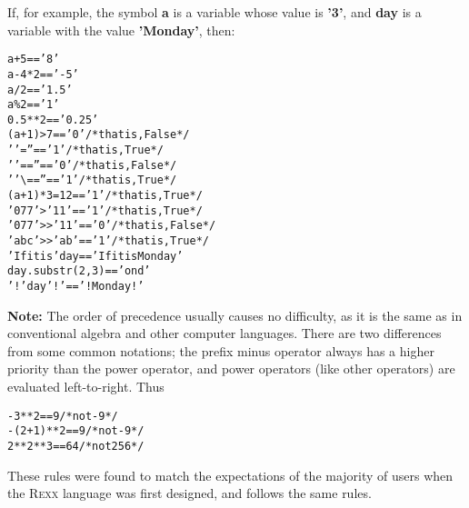  If, for example, the symbol \textbf{a} is a variable whose value
is \textbf{'3'}, and \textbf{day} is a variable with the
value \textbf{'Monday'}, then:
\begin{alltt}
a+5              ==  '8'
a-4*2            ==  '-5'
a/2              ==  '1.5'
a\%2              ==  '1'
0.5**2           ==  '0.25'
(a+1)>7          ==  '0'            /* that is, False */
' '=''           ==  '1'            /* that is, True  */
' '==''          ==  '0'            /* that is, False */
' '\textbackslash ==''         ==  '1'            /* that is, True  */
(a+1)*3=12       ==  '1'            /* that is, True  */
'077'>'11'       ==  '1'            /* that is, True  */
'077'>>'11'      ==  '0'            /* that is, False */
'abc'>>'ab'      ==  '1'            /* that is, True  */
'If it is' day   ==  'If it is Monday'
day.substr(2,3)  ==  'ond'
'!'day'!'        ==  '!Monday!'
\end{alltt}
\textbf{Note: }The \nr{} order of precedence usually causes no difficulty, as it
is the same as in conventional algebra and other computer languages.
There are two differences from some common notations; the prefix minus
operator always has a higher priority than the power operator, and
power operators (like other operators) are evaluated left-to-right.
Thus
\begin{alltt}
-3**2      ==  9    /* not -9  */
-(2+1)**2  ==  9    /* not -9  */
2**2**3    ==  64   /* not 256 */
\end{alltt}
 
These rules were found to match the expectations of the majority of
users when the R\textsc{exx} language was first designed, and \nr{} follows the
same rules.
